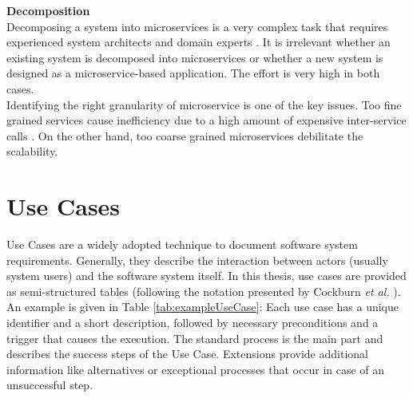 \noindent
\textbf{Decomposition}\\
Decomposing a system into microservices is a very complex task that requires experienced system architects and domain experts \cite{Fowler}. It is irrelevant whether an existing system is decomposed into microservices or whether a new system is designed as a microservice-based application. The effort is very high in both cases.\\
Identifying the right granularity of microservice is one of the key issues. Too fine grained services cause inefficiency due to a high amount of expensive inter-service calls \cite{DomainEngineeringMunezero}. On the other hand, too coarse grained microservices debilitate the scalability. \\

 



\section{Use Cases}
\label{sec:PrepApproach:UC}
Use Cases are a widely adopted technique to document software system requirements. Generally, they describe the interaction between actors (usually system users) and the software system itself. In this thesis, use cases are provided as semi-structured tables (following the notation presented by Cockburn \textit{et al.} \cite{Cockburn}). \\ An example is given in Table \ref{tab:exampleUseCase}: Each use case has a unique identifier and a short description, followed by necessary preconditions and a trigger that causes the execution. The standard process is the main part and describes the success steps of the Use Case. Extensions provide additional information like alternatives or exceptional processes that occur in case of an unsuccessful step. 




